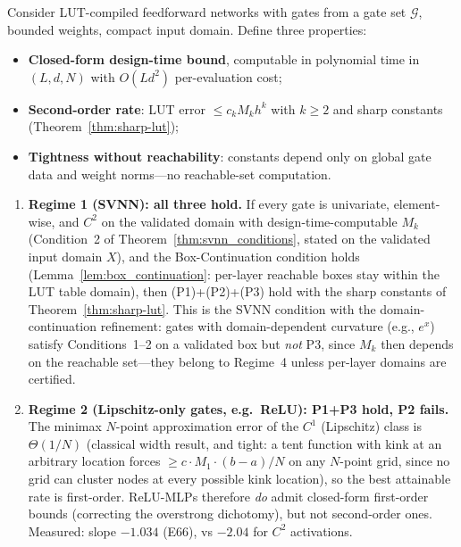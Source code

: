 \setcounter{theorem}{9}
\begin{theorem}
\label{thm:trichotomy}
Consider LUT-compiled feedforward networks with gates from a gate set
$\mathcal{G}$, bounded weights, compact input domain. Define three
properties:
\begin{itemize}
    \item[(P1)] \textbf{Closed-form design-time bound}, computable in
    polynomial time in $(L, d, N)$ with $O(L d^2)$ per-evaluation cost;
    \item[(P2)] \textbf{Second-order rate}: LUT error $\leq c_k M_k h^k$
    with $k \geq 2$ and sharp constants (Theorem~\ref{thm:sharp-lut});
    \item[(P3)] \textbf{Tightness without reachability}: constants depend
    only on global gate data and weight norms---no reachable-set
    computation.
\end{itemize}

\begin{enumerate}
    \item \textbf{Regime 1 (SVNN): all three hold.} If every gate is
    univariate, element-wise, and $C^2$ on the validated domain with
    design-time-computable $M_k$ (Condition~2 of
    Theorem~\ref{thm:svnn_conditions}, stated on the validated input
    domain $X$), and the Box-Continuation condition holds
    (Lemma~\ref{lem:box_continuation}: per-layer reachable boxes stay
    within the LUT table domain), then (P1)+(P2)+(P3) hold with the
    sharp constants of Theorem~\ref{thm:sharp-lut}. This is the SVNN
    condition with the domain-continuation refinement: gates with
    domain-dependent curvature (e.g., $e^x$) satisfy Conditions~1--2
    on a validated box but \emph{not} P3, since $M_k$ then depends on
    the reachable set---they belong to Regime~4 unless per-layer
    domains are certified.

    \item \textbf{Regime 2 (Lipschitz-only gates, e.g.\ ReLU): P1+P3 hold,
    P2 fails.} The minimax $N$-point approximation error of the $C^1$
    (Lipschitz) class is $\Theta(1/N)$ (classical width result, and
    tight: a tent function with kink at an arbitrary location forces
    $\geq c \cdot M_1 \cdot (b-a)/N$ on any $N$-point grid, since no
    grid can cluster nodes at every possible kink location), so the
    best attainable rate is first-order. ReLU-MLPs therefore \emph{do}
    admit closed-form first-order bounds (correcting the overstrong
    dichotomy), but not second-order ones. Measured: slope $-1.034$
    (E66), vs $-2.04$ for $C^2$ activations.


\end{enumerate}
\end{theorem}
